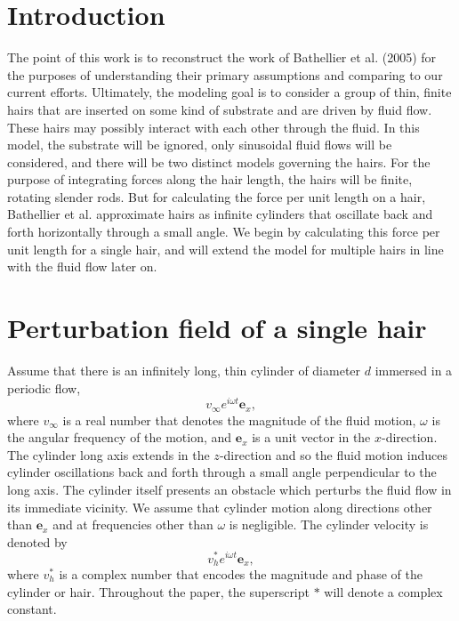 \documentclass[11pt]{amsart}
\newcommand{\vinf}{v_{\infty}}
\newcommand{\om}{\omega}
\newcommand{\ex}{\mathbf{e}_x}
\newcommand{\bee}[1]{\begin{equation} #1 \end{equation}}
\begin{document}
	
	\section{Introduction}
	The point of this work is to reconstruct the work of Bathellier et al. (2005) for the purposes of understanding their primary assumptions and comparing to our current efforts. Ultimately, the modeling goal is to consider a group of thin, finite hairs that are inserted on some kind of substrate and are driven by fluid flow. These hairs may possibly interact with each other through the fluid. In this model, the substrate will be ignored, only sinusoidal fluid flows will be considered, and there will be two distinct models governing the hairs. For the purpose of integrating forces along the hair length, the hairs will be finite, rotating slender rods. But for calculating the force per unit length on a hair, Bathellier et al. approximate hairs as infinite cylinders that oscillate back and forth horizontally through a small angle. We begin by calculating this force per unit length for a single hair, and will extend the model for multiple hairs in line with the fluid flow later on.
	
	\section{Perturbation field of a single hair}
	Assume that there is an infinitely long, thin cylinder of diameter $d$ immersed in a periodic flow,
\bee{
\vinf e^{i\om t}\ex, \label{eqn:farvel}
}
where $\vinf$ is a real number that denotes the magnitude of the fluid motion, $\om$ is the angular frequency of the motion, and $\ex$ is a unit vector in the $x$-direction. The cylinder long axis extends in the $z$-direction and so the fluid motion induces cylinder oscillations back and forth through a small angle perpendicular to the long axis. The cylinder itself presents an obstacle which perturbs the fluid flow in its immediate vicinity. We assume that cylinder motion along directions other than $\ex$ and at frequencies other than $\om$ is negligible.  The cylinder velocity is denoted by
\bee{
v_h^* e^{i\om t}\ex, \label{eqn:hairvel}
}
where $v_h^*$ is a complex number that encodes the magnitude and phase of the cylinder or hair. Throughout the paper, the superscript $*$ will denote a complex constant. 
\end{document}
